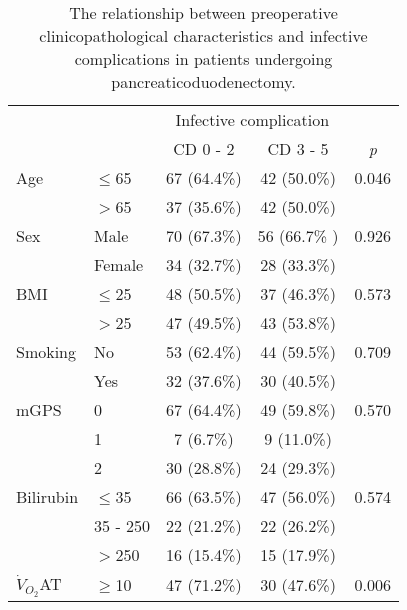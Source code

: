 \begin{table}[p]
	\centering
	\caption{The relationship between preoperative clinicopathological characteristics and infective complications in patients undergoing pancreaticoduodenectomy.}
	\label{table:crp_comp_preop_factors}
	\renewcommand{\arraystretch}{1.5} %
	\setlength{\tabcolsep}{12pt} %
	\begin{tabular}{|l l c c c|}
		\hline
		                  &          & \multicolumn{2}{c}{Infective complication} &  \\
		                  &          & CD 0 - 2    & CD 3 - 5                     & \textit{p} \\ \hline
		Age               & $\leq$65 & 67 (64.4\%) & 42 (50.0\%)                  & 0.046      \\
		                  & $>$65    & 37 (35.6\%) & 42 (50.0\%)                  &  \\
		Sex               & Male     & 70 (67.3\%) & 56 (66.7\% )                 & 0.926      \\
		                  & Female   & 34 (32.7\%) & 28 (33.3\%)                  &  \\
		BMI               & $\leq$25 & 48 (50.5\%) & 37 (46.3\%)                  & 0.573      \\
		                  & $>$25    & 47 (49.5\%) & 43 (53.8\%)                  &  \\
		Smoking           & No       & 53 (62.4\%) & 44 (59.5\%)                  & 0.709      \\
		                  & Yes      & 32 (37.6\%) & 30 (40.5\%)                  &  \\
		mGPS              & 0        & 67 (64.4\%) & 49 (59.8\%)                  & 0.570      \\
		                  & 1        & 7 (6.7\%)   & 9 (11.0\%)                   &  \\
		                  & 2        & 30 (28.8\%) & 24 (29.3\%)                  &  \\
		Bilirubin         & $\leq$35 & 66 (63.5\%) & 47 (56.0\%)                  & 0.574      \\
		                  & 35 - 250 & 22 (21.2\%) & 22 (26.2\%)                  &  \\
		                  & $>$250   & 16 (15.4\%) & 15 (17.9\%)                  &  \\
		$\dot{V}_{O_2}$AT & $\geq$10 & 47 (71.2\%) & 30 (47.6\%)                  & 0.006      \\

\end{tabular}
\end{table}
